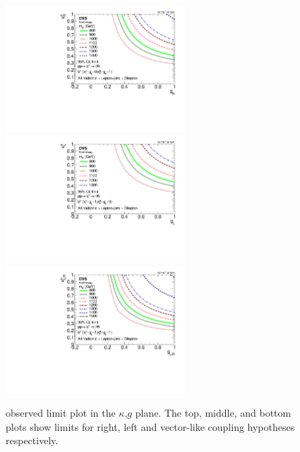 \begin{figure}[htcb]
\centering
\includegraphics[width=0.6\textwidth]{AN-14-049/figs/bayesian_observed_hadronic_semileptonic_right_2Dlimit_plot.pdf}\\
\includegraphics[width=0.6\textwidth]{AN-14-049/figs/bayesian_observed_hadronic_semileptonic_left_2Dlimit_plot.pdf}\\
\includegraphics[width=0.6\textwidth]{AN-14-049/figs/bayesian_observed_hadronic_semileptonic_vector_2Dlimit_plot.pdf}\\
\caption{observed limit plot in the $\kappa$,$g$ plane.  The top, middle, and bottom plots show limits for right, left and vector-like coupling hypotheses respectively.}
\label{figs:bsthetalimit2dobs}
\end{figure}

